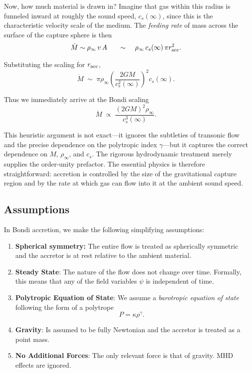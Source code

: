 \par
Now, how much material is drawn in? Imagine that gas within this radius is funneled
inward at roughly the sound speed, $c_s(\infty)$, since this is the characteristic
velocity scale of the medium. The \emph{feeding rate} of mass across the surface of
the capture sphere is then
\[
\dot{M} \sim \rho_\infty \, v \, A
\;\;\;\;\;\; \sim \;\;\;\; \rho_\infty \, c_s(\infty) \, \pi r_{\rm acc}^2.
\]

\par
Substituting the scaling for $r_{\rm acc}$,
\[
\dot{M} \;\sim\; \pi \rho_\infty \left(\frac{2GM}{c_s^2(\infty)}\right)^2 c_s(\infty).
\]

\par
Thus we immediately arrive at the Bondi scaling
\[
\boxed{\dot{M} \;\propto\; \frac{(2GM)^2 \rho_\infty}{c_s^3(\infty)}.}
\]

\par
This heuristic argument is not exact—it ignores the subtleties of transonic flow and
the precise dependence on the polytropic index $\gamma$—but it captures the correct
dependence on $M$, $\rho_\infty$, and $c_s$. The rigorous hydrodynamic treatment
merely supplies the order-unity prefactor. The essential physics is therefore
straightforward: accretion is controlled by the size of the gravitational capture
region and by the rate at which gas can flow into it at the ambient sound speed.


\subsection*{Assumptions}

In Bondi accretion, we make the following simplifying assumptions:
\vspace{0.5cm}
\begin{enumerate}
    \item \textbf{Spherical symmetry: }The entire flow is treated as spherically symmetric and the accretor is at rest relative to the ambient material. 
    \item \textbf{Steady State}: The nature of the flow does not change over time. Formally, this means that any of the field variables $\psi$ is independent of time. 
    \item \textbf{Polytropic Equation of State}: We assume a \textit{barotropic equation of state} following the form of a polytrope
    \[
    P = \kappa \rho^\gamma.
    \]
    \item \textbf{Gravity}: Is assumed to be fully Newtonian and the accretor is treated as a point mass.
    \item \textbf{No Additional Forces}: The only relevant force is that of gravity. MHD effects are ignored.
\end{enumerate}

